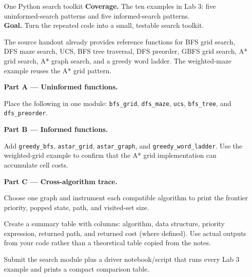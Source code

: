
\begin{labproject}{One Python search toolkit}
\textbf{Coverage.} The ten examples in Lab 3: five uninformed-search patterns and five informed-search patterns.\\
\textbf{Goal.} Turn the repeated code into a small, testable search toolkit.

\begin{labmode}
The source handout already provides reference functions for BFS grid search, DFS maze search, UCS, BFS tree traversal, DFS preorder, GBFS grid search, A* grid search, A* graph search, and a greedy word ladder. The weighted-maze example reuses the A* grid pattern.
\end{labmode}

\medskip\noindent\textbf{Part A --- Uninformed functions.}\par
Place the following in one module: \texttt{bfs\_grid}, \texttt{dfs\_maze}, \texttt{ucs}, \texttt{bfs\_tree}, and \texttt{dfs\_preorder}.

\medskip\noindent\textbf{Part B --- Informed functions.}\par
Add \texttt{greedy\_bfs}, \texttt{astar\_grid}, \texttt{astar\_graph}, and \texttt{greedy\_word\_ladder}. Use the weighted-grid example to confirm that the A* grid implementation can accumulate cell costs.

\medskip\noindent\textbf{Part C --- Cross-algorithm trace.}\par
Choose one graph and instrument each compatible algorithm to print the frontier priority, popped state, path, and visited-set size.

\begin{tryit}
Create a summary table with columns: algorithm, data structure, priority expression, returned path, and returned cost (where defined). Use actual outputs from your code rather than a theoretical table copied from the notes.
\end{tryit}
\end{labproject}

\begin{labdeliverable}
Submit the search module plus a driver notebook/script that runs every Lab 3 example and prints a compact comparison table.
\end{labdeliverable}
